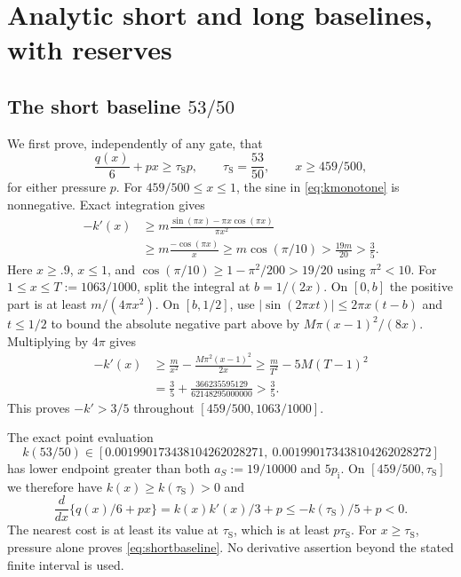 \documentclass[11pt]{amsart}
\numberwithin{equation}{section}
\newcommand{\pint}{p_{\mathrm i}}
\newcommand{\tS}{\tau_{\mathrm S}}
\begin{document}
\section{Analytic short and long baselines, with reserves}

\subsection{The short baseline $53/50$}

We first prove, independently of any gate, that
\begin{equation}\label{eq:shortbaseline}
 \frac{q(x)}6+px\geq\tS p,\qquad \tS=\frac{53}{50},
 \qquad x\geq459/500,
\end{equation}
for either pressure $p$.
For $459/500\leq x\leq1$, the sine in
\eqref{eq:kmonotone} is nonnegative. Exact integration gives
\begin{align*}
 -k'(x)&\geq m\frac{\sin(\pi x)-\pi x\cos(\pi x)}{\pi x^2}\\
 &\geq m\frac{-\cos(\pi x)}x
 \geq m\cos(\pi/10)>\frac{19m}{20}>\frac35.
\end{align*}
Here $x\geq.9$, $x\leq1$, and
$\cos(\pi/10)\geq1-\pi^2/200>19/20$ using $\pi^2<10$.
For $1\leq x\leq T:=1063/1000$, split the integral at
$b=1/(2x)$. On $[0,b]$ the positive part is at least
$m/(4\pi x^2)$. On $[b,1/2]$, use
$|\sin(2\pi xt)|\leq2\pi x(t-b)$ and $t\leq1/2$ to bound
the absolute negative part above by $M\pi(x-1)^2/(8x)$.
Multiplying by $4\pi$ gives
\begin{align}
 -k'(x)&\geq\frac m{x^2}-\frac{M\pi^2(x-1)^2}{2x}
 \geq\frac m{T^2}-5M(T-1)^2\nonumber\\
 &=\frac35+\frac{366235595129}{62148295000000}>\frac35.
 \label{eq:shortderivative}
\end{align}
This proves $-k'>3/5$ throughout $[459/500,1063/1000]$.

The exact point evaluation
\begin{equation}\label{eq:shortpoint}
 k(53/50)\in
 [0.001990173438104262028271,\ 0.001990173438104262028272]
\end{equation}
has lower endpoint greater than both $a_S:=19/10000$ and
$5\pint$. On $[459/500,\tS]$ we therefore have
$k(x)\geq k(\tS)>0$ and
\[
 \frac{d}{dx}\{q(x)/6+px\}=k(x)k'(x)/3+p
       \leq-k(\tS)/5+p<0.
\]
The nearest cost is at least its value at $\tS$, which is at
least $p\tS$. For $x\geq\tS$, pressure alone proves
\eqref{eq:shortbaseline}. No derivative assertion beyond the
stated finite interval is used.
\end{document}
